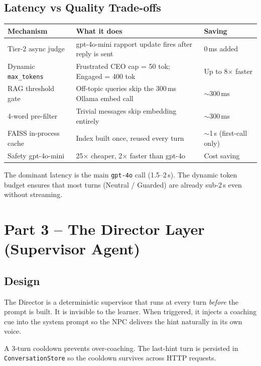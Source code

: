 \documentclass[11pt,a4paper]{article}
\begin{document}
\subsection{Latency vs Quality Trade-offs}

\begin{center}
\begin{tabularx}{0.96\linewidth}{@{}lXl@{}}
\toprule
\textbf{Mechanism} & \textbf{What it does} & \textbf{Saving} \\
\midrule
Tier-2 async judge &
  gpt-4o-mini rapport update fires after reply is sent &
  0\,ms added \\
Dynamic \texttt{max\_tokens} &
  Frustrated CEO cap = 50 tok; Engaged = 400 tok &
  Up to 8$\times$ faster \\
RAG threshold gate &
  Off-topic queries skip the 300\,ms Ollama embed call &
  $\sim$300\,ms \\
4-word pre-filter &
  Trivial messages skip embedding entirely &
  $\sim$300\,ms \\
FAISS in-process cache &
  Index built once, reused every turn &
  $\sim$1\,s (first-call only) \\
Safety gpt-4o-mini &
  25$\times$ cheaper, 2$\times$ faster than gpt-4o &
  Cost saving \\
\bottomrule
\end{tabularx}
\end{center}

The dominant latency is the main \texttt{gpt-4o} call (1.5--2\,s). The dynamic
token budget ensures that most turns (Neutral / Guarded) are already
sub-2\,s even without streaming.

\section{Part 3 -- The Director Layer (Supervisor Agent)}

\subsection{Design}

The Director is a deterministic supervisor that runs at every turn
\emph{before} the prompt is built. It is invisible to the learner.
When triggered, it injects a coaching cue into the system prompt so the
NPC delivers the hint naturally in its own voice.

A 3-turn cooldown prevents over-coaching. The last-hint turn is
persisted in \texttt{ConversationStore} so the cooldown survives across
HTTP requests.
\end{document}
